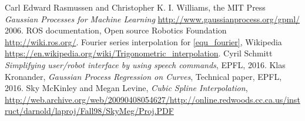 \begin{thebibliography}{1}

 Carl Edward Rasmussen and Christopher K. I. Williams, the MIT Press {\em Gaussian Processes for Machine Learning} \url{http://www.gaussianprocess.org/gpml/} 2006.
 ROS documentation, Open source Robotics Foundation \url{http://wiki.ros.org/}.
 Fourier series interpolation for \autoref{equ_fourier}, Wikipedia \url{https://en.wikipedia.org/wiki/Trigonometric_interpolation}.
 Cyril Schmitt {\em Simplifying user/robot interface by using speech commands}, EPFL, 2016.
 Klas Kronander, {\em Gaussian Process Regression on Curves}, Technical paper, EPFL, 2016.
 Sky McKinley and Megan Levine, {\em Cubic Spline Interpolation}, \url{http://web.archive.org/web/20090408054627/http://online.redwoods.cc.ca.us/instruct/darnold/laproj/Fall98/SkyMeg/Proj.PDF}

\end{thebibliography}